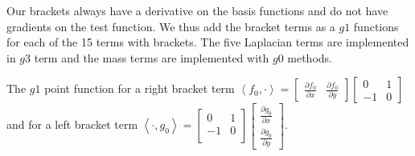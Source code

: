 \documentclass[10pt]{article}
\begin{document}
Our brackets always have a derivative on the basis functions and do not have gradients on the test function.
We thus add the bracket terms as a $g1$ functions for each of the 15 terms with brackets.
The five Laplacian terms are implemented in $g3$ term and the mass terms are implemented with $g0$ methods.

The $g1$ point function for a right bracket term 
$
\left \langle f_0, \cdot  \right \rangle = \begin{bmatrix}  \frac{\partial f_0}{\partial x} & \frac{\partial f_0}{\partial y}  \end{bmatrix} \begin{bmatrix}
0 & 1 \\ 
-1 & 0
\end{bmatrix}
$ and for a left bracket term $
\left \langle \cdot, g_0  \right \rangle = \begin{bmatrix}
0 & 1 \\ 
-1 & 0 \\
\end{bmatrix}
\begin{bmatrix}  \frac{\partial g_0}{\partial x} \\ \frac{\partial g_0}{\partial y}  \end{bmatrix}.
$
\end{document}
